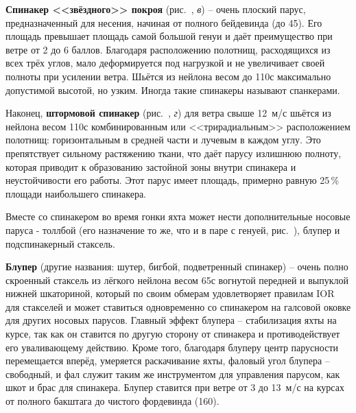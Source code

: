 \textbf{Спинакер <<звёздного>> покроя}
(рис.~, \textit{в}) \--- очень плоский парус, предназначенный
для несения, начиная от полного бейдевинда (до 45\gr). Его площадь
превышает площадь самой большой генуи и даёт преимущество при ветре от
2 до 6 баллов. Благодаря расположению полотнищ, расходящихся из всех
трёх углов, мало деформируется под нагрузкой и не увеличивает своей
полноты при усилении ветра. Шьётся из нейлона весом до 110\gmsq с
максимально допустимой высотой, но узким. Иногда такие спинакеры
называют спанкерами.

Наконец, \textbf{штормовой спинакер}
(рис.~, \textit{г}) для ветра свыше 12~м/с шьётся из нейлона
весом 110\gmsq с комбинированным или <<трирадиальным>> расположением
полотнищ: горизонтальным в средней части и лучевым в каждом углу. Это
препятствует сильному растяжению ткани, что даёт парусу излишнюю
полноту, которая приводит к образованию застойной зоны внутри
спинакера и неустойчивости его работы. Этот парус имеет площадь,
примерно равную 25\,\% площади наибольшего спинакера.

Вместе со спинакером во время гонки яхта может нести дополнительные
носовые паруса - толлбой (его назначение то же, что и в паре с генуей,
рис.~), блупер и подспинакерный стаксель.

\textbf{Блупер}
(другие названия: шутер, бигбой, подветренный спинакер) \--- очень
полно скроенный стаксель из лёгкого нейлона весом 65\gmsq с вогнутой
передней и выпуклой нижней шкаториной, который по своим обмерам
удовлетворяет правилам IOR для стакселей и может ставиться
одновременно со спинакером на галсовой оковке для других носовых
парусов. Главный эффект блупера \--- стабилизация яхты на курсе, так
как он ставится по другую сторону от спинакера и противодействует его
уваливающему действию. Кроме того, благодаря блуперу центр парусности
перемещается вперёд, умеряется раскачивание яхты, фаловый угол блупера
\--- свободный, и фал служит таким же инструментом для управления
парусом, как шкот и брас для спинакера. Блупер ставится при ветре от 3
до 13~м/с на курсах от полного бакштага до чистого фордевинда
(160\gr).
 
